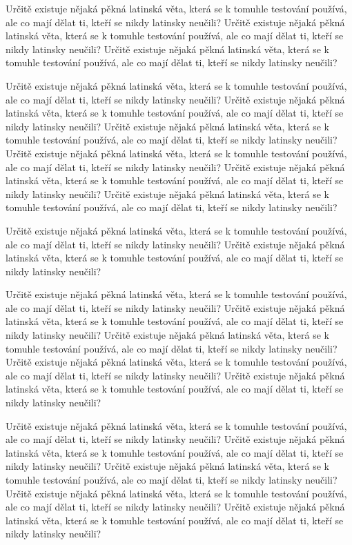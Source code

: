 \documentclass[11pt,twoside,a4paper]{book}
\begin{document}
	Určitě existuje nějaká pěkná latinská věta, která se k tomuhle testování používá, ale co mají dělat ti, kteří se nikdy latinsky neučili? Určitě existuje nějaká pěkná latinská věta, která se k tomuhle testování používá, ale co mají dělat ti, kteří se nikdy latinsky neučili? Určitě existuje nějaká pěkná latinská věta, která se k tomuhle testování používá, ale co mají dělat ti, kteří se nikdy latinsky neučili?
	
	Určitě existuje nějaká pěkná latinská věta, která se k tomuhle testování používá, ale co mají dělat ti, kteří se nikdy latinsky neučili? Určitě existuje nějaká pěkná latinská věta, která se k tomuhle testování používá, ale co mají dělat ti, kteří se nikdy latinsky neučili? Určitě existuje nějaká pěkná latinská věta, která se k tomuhle testování používá, ale co mají dělat ti, kteří se nikdy latinsky neučili? Určitě existuje nějaká pěkná latinská věta, která se k tomuhle testování používá, ale co mají dělat ti, kteří se nikdy latinsky neučili? Určitě existuje nějaká pěkná latinská věta, která se k tomuhle testování používá, ale co mají dělat ti, kteří se nikdy latinsky neučili? Určitě existuje nějaká pěkná latinská věta, která se k tomuhle testování používá, ale co mají dělat ti, kteří se nikdy latinsky neučili?
	
	Určitě existuje nějaká pěkná latinská věta, která se k tomuhle testování používá, ale co mají dělat ti, kteří se nikdy latinsky neučili? Určitě existuje nějaká pěkná latinská věta, která se k tomuhle testování používá, ale co mají dělat ti, kteří se nikdy latinsky neučili?
	
	Určitě existuje nějaká pěkná latinská věta, která se k tomuhle testování používá, ale co mají dělat ti, kteří se nikdy latinsky neučili? Určitě existuje nějaká pěkná latinská věta, která se k tomuhle testování používá, ale co mají dělat ti, kteří se nikdy latinsky neučili? Určitě existuje nějaká pěkná latinská věta, která se k tomuhle testování používá, ale co mají dělat ti, kteří se nikdy latinsky neučili? Určitě existuje nějaká pěkná latinská věta, která se k tomuhle testování používá, ale co mají dělat ti, kteří se nikdy latinsky neučili? Určitě existuje nějaká pěkná latinská věta, která se k tomuhle testování používá, ale co mají dělat ti, kteří se nikdy latinsky neučili?
	
	Určitě existuje nějaká pěkná latinská věta, která se k tomuhle testování používá, ale co mají dělat ti, kteří se nikdy latinsky neučili? Určitě existuje nějaká pěkná latinská věta, která se k tomuhle testování používá, ale co mají dělat ti, kteří se nikdy latinsky neučili? Určitě existuje nějaká pěkná latinská věta, která se k tomuhle testování používá, ale co mají dělat ti, kteří se nikdy latinsky neučili? Určitě existuje nějaká pěkná latinská věta, která se k tomuhle testování používá, ale co mají dělat ti, kteří se nikdy latinsky neučili? Určitě existuje nějaká pěkná latinská věta, která se k tomuhle testování používá, ale co mají dělat ti, kteří se nikdy latinsky neučili?
	
\end{document}
